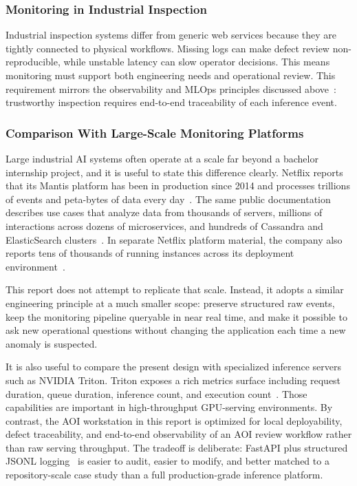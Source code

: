 \documentclass[12pt,a4paper]{article}
\begin{document}
\subsubsection{Monitoring in Industrial Inspection}
Industrial inspection systems differ from generic web services because they are
tightly connected to physical workflows. Missing logs can make defect review
non-reproducible, while unstable latency can slow operator decisions. This
means monitoring must support both engineering needs and operational review.
This requirement mirrors the observability and MLOps principles discussed
above~\cite{burns2016sre, shankar2022observability}: trustworthy inspection
requires end-to-end traceability of each inference event.

\subsubsection{Comparison With Large-Scale Monitoring Platforms}
Large industrial AI systems often operate at a scale far beyond a bachelor
internship project, and it is useful to state this difference clearly. Netflix
reports that its Mantis platform has been in production since 2014 and
processes trillions of events and peta-bytes of data every day~\cite{mantis}. The same public
documentation describes use cases that analyze data from thousands of servers,
millions of interactions across dozens of microservices, and hundreds of
Cassandra and ElasticSearch clusters~\cite{mantisusecases}. In separate Netflix platform material,
the company also reports tens of thousands of running instances across its
deployment environment~\cite{netflixoss}.

This report does not attempt to replicate that scale. Instead, it adopts a
similar engineering principle at a much smaller scope: preserve structured raw
events, keep the monitoring pipeline queryable in near real time, and make it
possible to ask new operational questions without changing the application each
time a new anomaly is suspected.

It is also useful to compare the present design with specialized inference
servers such as NVIDIA Triton. Triton exposes a rich metrics surface including
request duration, queue duration, inference count, and execution count~\cite{tritonmetrics}. Those
capabilities are important in high-throughput GPU-serving environments. By
contrast, the AOI workstation in this report is optimized for local
deployability, defect traceability, and end-to-end observability of an AOI
review workflow rather than raw serving throughput. The tradeoff is deliberate:
FastAPI plus structured JSONL logging~\cite{fastapi} is easier to audit, easier to modify, and
better matched to a repository-scale case study than a full production-grade
inference platform.
\end{document}
